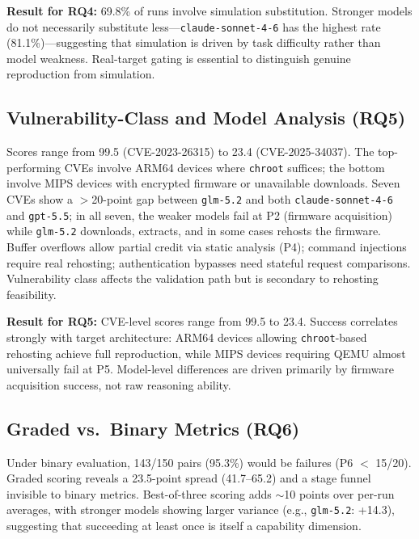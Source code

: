 \begin{mdframed}[linecolor=black,linewidth=1pt,backgroundcolor=gray!10,roundcorner=3pt,nobreak=true]
\noindent\textbf{Result for RQ4:} 69.8\% of runs involve simulation substitution. Stronger models do not necessarily substitute less---\texttt{claude-sonnet-4-6} has the highest rate (81.1\%)---suggesting that simulation is driven by task difficulty rather than model weakness. Real-target gating is essential to distinguish genuine reproduction from simulation.
\end{mdframed}

\subsection{Vulnerability-Class and Model Analysis (RQ5)}
Scores range from 99.5 (CVE-2023-26315) to 23.4 (CVE-2025-34037). The top-performing CVEs involve ARM64 devices where \texttt{chroot} suffices; the bottom involve MIPS devices with encrypted firmware or unavailable downloads. Seven CVEs show a $>$20-point gap between \texttt{glm-5.2} and both \texttt{claude-sonnet-4-6} and \texttt{gpt-5.5}; in all seven, the weaker models fail at P2 (firmware acquisition) while \texttt{glm-5.2} downloads, extracts, and in some cases rehosts the firmware. Buffer overflows allow partial credit via static analysis (P4); command injections require real rehosting; authentication bypasses need stateful request comparisons. Vulnerability class affects the validation path but is secondary to rehosting feasibility.

\begin{mdframed}[linecolor=black,linewidth=1pt,backgroundcolor=gray!10,roundcorner=3pt,nobreak=true]
\noindent\textbf{Result for RQ5:} CVE-level scores range from 99.5 to 23.4. Success correlates strongly with target architecture: ARM64 devices allowing \texttt{chroot}-based rehosting achieve full reproduction, while MIPS devices requiring QEMU almost universally fail at P5. Model-level differences are driven primarily by firmware acquisition success, not raw reasoning ability.
\end{mdframed}

\subsection{Graded vs.\ Binary Metrics (RQ6)}
Under binary evaluation, 143/150 pairs (95.3\%) would be failures (P6 $<$ 15/20). Graded scoring reveals a 23.5-point spread (41.7--65.2) and a stage funnel invisible to binary metrics. Best-of-three scoring adds $\sim$10 points over per-run averages, with stronger models showing larger variance (e.g., \texttt{glm-5.2}: +14.3), suggesting that succeeding at least once is itself a capability dimension.

